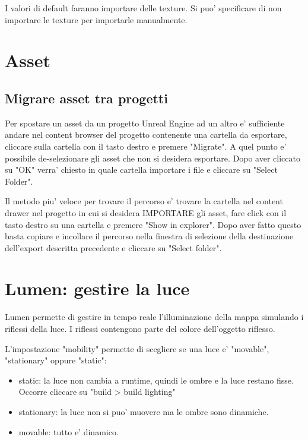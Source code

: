             I valori di default faranno importare delle texture. Si puo' specificare di non importare le texture per importarle manualmente.


    \section{Asset}

        \subsection{Migrare asset tra progetti}

            Per spostare un asset da un progetto Unreal Engine ad un altro e' sufficiente andare nel content browser del progetto contenente una cartella da esportare, cliccare sulla cartella con il tasto destro e premere "Migrate".
            A quel punto e' possibile de-selezionare gli asset che non si desidera esportare. Dopo aver cliccato su "OK" verra' chiesto in quale cartella importare i file e cliccare su "Select Folder".

            Il metodo piu' veloce per trovare il percorso e' trovare la cartella nel content drawer nel progetto in cui si desidera IMPORTARE gli asset, fare click con il tasto destro su una cartella e premere "Show in explorer".
            Dopo aver fatto questo basta copiare e incollare il percorso nella finestra di selezione della destinazione dell'export descritta precedente e cliccare su "Select folder".


    \section{Lumen: gestire la luce}

        Lumen permette di gestire in tempo reale l'illuminazione della mappa simulando i riflessi della luce.
        I riflessi contengono parte del colore dell'oggetto riflesso.

        L'impostazione "mobility" permette di scegliere se una luce e' "movable", "stationary" oppure "static":
        \begin{itemize}
            \item static: la luce non cambia a runtime, quindi le ombre e la luce restano fisse. Occorre cliccare su "build > build lighting"
            \item stationary: la luce non si puo' muovere ma le ombre sono dinamiche.
            \item movable: tutto e' dinamico.
        \end{itemize}



